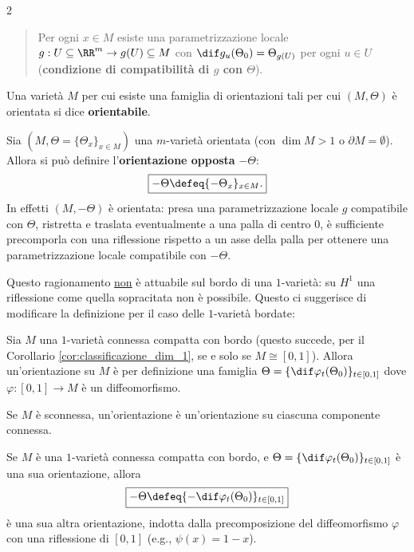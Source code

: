 \begin{multicols*}{2}
\begin{definition}[$m$-varietà orientata, $m > 1$ o $\partial M = \emptyset$]
        \begin{quote}
            Per ogni $x \in M$ esiste una parametrizzazione locale $g : U \subseteq \RR^m \to g(U) \subseteq M$ con
            $\dif g_u (\Theta_0) = \Theta_{g(U)}$ per ogni $u \in U$ (\textbf{condizione di compatibilità di $g$ con $\Theta$}).
        \end{quote}

        Una varietà $M$ per cui esiste una famiglia di orientazioni tali per cui $(M, \Theta)$ è orientata si
        dice \textbf{orientabile}.
    \end{definition}

    \begin{remark} \label{rmk:orientazione_opposta_1}
        Sia $(M, \Theta = \{ \Theta_x \}_{x \in M})$ una $m$-varietà orientata (con $\dim M > 1$ o $\partial M = \emptyset$).
        Allora si può definire l'\textbf{orientazione opposta} $-\Theta$:
        \[
            \boxed{-\Theta \defeq \{ -\Theta_x \}_{x \in M}.}
        \]
        In effetti $(M, -\Theta)$ è orientata: presa una parametrizzazione locale $g$ compatibile con
        $\Theta$, ristretta e traslata eventualmente a una palla di centro $0$, è sufficiente precomporla con una riflessione rispetto a un asse
        della palla per ottenere una parametrizzazione locale compatibile con $-\Theta$. \smallskip
    \end{remark}

    Questo ragionamento \underline{non} è attuabile sul bordo di una $1$-varietà:
    su $H^1$ una riflessione come quella sopracitata non è possibile. Questo ci suggerisce
    di modificare la definizione per il caso delle $1$-varietà bordate:

    \begin{definition}
        Sia $M$ una $1$-varietà connessa compatta con bordo (questo succede, per il Corollario \ref{cor:classificazione_dim_1}, se e solo se $M \cong [0, 1]$).
        Allora un'orientazione su $M$ è per definizione una famiglia
        $\Theta = \{\dif \varphi_t(\Theta_0)\}_{t \in [0, 1]}$ dove
        $\varphi : [0, 1] \to M$ è un diffeomorfismo. \smallskip

        Se $M$ è sconnessa, un'orientazione è un'orientazione su ciascuna componente connessa.
    \end{definition}

    \begin{remark} \label{rmk:orientazione_opposta_2}
        Se $M$ è una $1$-varietà connessa compatta con bordo, e $\Theta = \{\dif \varphi_t(\Theta_0)\}_{t \in [0, 1]}$ è
        una sua orientazione, allora
        \[
            \boxed{-\Theta \defeq \{-\dif \varphi_t(\Theta_0)\}_{t \in [0, 1]}}
        \]
        è una sua altra orientazione, indotta dalla precomposizione del diffeomorfismo $\varphi$ con
        una riflessione di $[0, 1]$ (e.g., $\psi(x) = 1-x$).
    \end{remark}


\end{multicols*}

